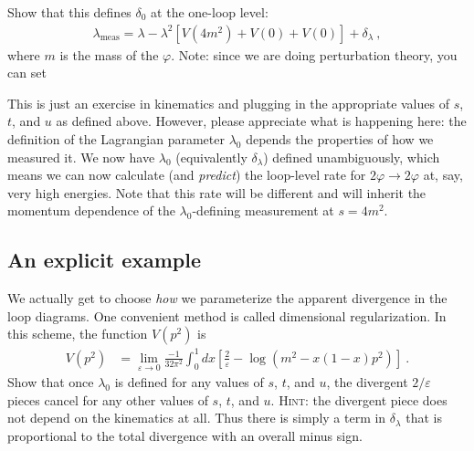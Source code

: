 \documentclass[12pt]{article}
\numberwithin{equation}{section}    %
\begin{document}
Show that this defines $\delta_0$ at the one-loop level:
\begin{align}
	\lambda_\text{meas} = \lambda - \lambda^2\left[
		V(4m^2)
		+ V(0)
		+ V(0)
	\right]  +\delta_\lambda \ ,
\end{align}
where $m$ is the mass of the $\varphi$. Note: since we are doing perturbation theory, you can set 


This is just an exercise in kinematics and plugging in the appropriate values of $s$, $t$, and $u$ as defined above. However, please appreciate what is happening here: the definition of the Lagrangian parameter $\lambda_0$ depends the properties of how we measured it. We now have $\lambda_0$ (equivalently $\delta_\lambda$) defined unambiguously, which means we can now calculate (and \emph{predict}) the loop-level rate for $2\varphi\to 2\varphi$ at, say, very high energies. Note that this rate will be different and will inherit the momentum dependence of the $\lambda_0$-defining measurement at $s=4m^2$.

\subsection{An explicit example}

We actually get to choose \emph{how} we parameterize the apparent divergence in the loop diagrams. One convenient method is called dimensional regularization. In this scheme, the function $V(p^2)$ is
\begin{align}
	V(p^2) &= \lim_{\varepsilon\to 0} \frac{-1}{32\pi^2}\int_0^1 dx
	\left[ \frac{2}{\varepsilon} - \log\left(m^2 - x(1-x)p^2\right) \right] \ .
\end{align}
Show that once $\lambda_0$ is defined for any values of $s$, $t$, and $u$, the divergent $2/\varepsilon$ pieces cancel for any other values of $s$, $t$, and $u$. \textsc{Hint:} the divergent piece does not depend on the kinematics at all. Thus there is simply a term in $\delta_\lambda$ that is proportional to the total divergence with an overall minus sign.
\end{document}
